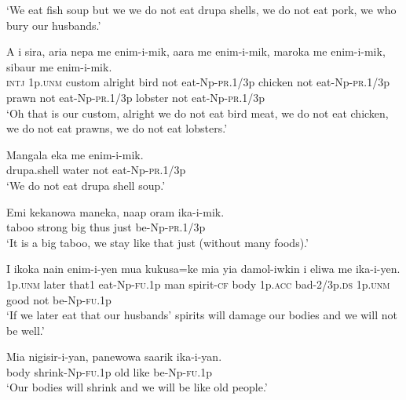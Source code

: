 \glt ‘We eat fish soup but we we do not eat drupa shells, we do not eat pork, we who bury our husbands.’ \\
\z


\ea\label{ex:a:x21}
\gll  A  i  sira,  aria  nepa  me  enim-i-mik,  aara              me  enim-i-mik,  maroka  me  enim-i-mik,  sibaur         me  enim-i-mik. \\
\textsc{intj}  1p.\textsc{unm}  custom  alright  bird  not  eat-Np-\textsc{pr}.1/3p  chicken not  eat-Np-\textsc{pr}.1/3p  prawn  not  eat-Np-\textsc{pr}.1/3p  lobster not  eat-Np-\textsc{pr}.1/3p \\




\glt ‘Oh that is our custom, alright we do not eat bird meat, we do not eat chicken, we do not eat prawns, we do not eat lobsters.’ \\
\z


\ea\label{ex:a:x22}
\gll  Mangala  eka  me  enim-i-mik. \\
drupa.shell  water  not  eat-Np-\textsc{pr}.1/3p \\
\glt ‘We do not eat drupa shell soup.’ \\
\z


\ea\label{ex:a:x23}
\gll  Emi  kekanowa  maneka,  naap  oram  ika-i-mik. \\
taboo  strong  big  thus  just  be-Np-\textsc{pr}.1/3p \\
\glt ‘It is a big taboo, we stay like that just (without many foods).’ \\
\z


\ea\label{ex:a:x24}
\gll  I  ikoka  nain  enim-i-yen  mua  kukusa=ke  mia  yia       damol-iwkin  i  eliwa  me  ika-i-yen. \\
1p.\textsc{unm}  later  that1  eat-Np-\textsc{fu}.1p  man  spirit-\textsc{cf}  body  1p.\textsc{acc} bad-2/3p.\textsc{ds}  1p.\textsc{unm}  good  not  be-Np-\textsc{fu}.1p \\


\glt ‘If we later eat that our husbands’ spirits will damage our bodies and we will not be well.’ \\
\z


\ea\label{ex:a:x25}
\gll  Mia  nigisir-i-yan,  panewowa  saarik  ika-i-yan. \\
body  shrink-Np-\textsc{fu}.1p  old  like  be-Np-\textsc{fu}.1p \\
\glt ‘Our bodies will shrink and we will be like old people.’ \\
\z


